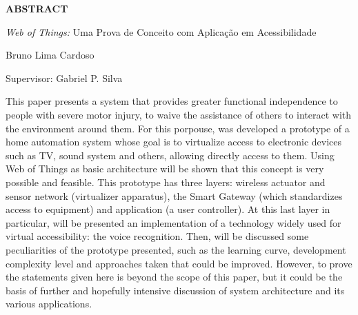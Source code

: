 \begin{titlepage}
\bigskip

\clearpage
\bigskip

\begin{center}
\centerline{\textbf{\large ABSTRACT}}


\bigskip

\emph{Web of Things:} Uma Prova de Conceito com Aplicação em Acessibilidade


\bigskip

Bruno Lima Cardoso


\end{center}
\bigskip


\bigskip

Supervisor: Gabriel P. Silva


\bigskip

This paper presents a system that provides greater functional independence to people with severe motor injury, to waive the assistance of others to interact with the environment around them. For this porpouse, was developed a prototype of a home automation system whose goal is to virtualize access to electronic devices such as TV, sound system and others, allowing directly access to them. Using Web of Things as basic architecture will be shown that this concept is very possible and feasible. This prototype has three layers: wireless actuator and sensor network (virtualizer apparatus), the Smart Gateway (which standardizes access to equipment) and application (a user controller). At this last layer in particular, will be presented an implementation of a technology widely used for virtual accessibility: the voice recognition. Then, will be discussed some peculiarities of the prototype presented, such as the learning curve, development complexity level and approaches taken that could be improved. However, to prove the statements given here is beyond the scope of this paper, but it could be the basis of further and hopefully intensive discussion of system architecture and its various applications.

\bigskip


\bigskip


\bigskip
\end{titlepage}
